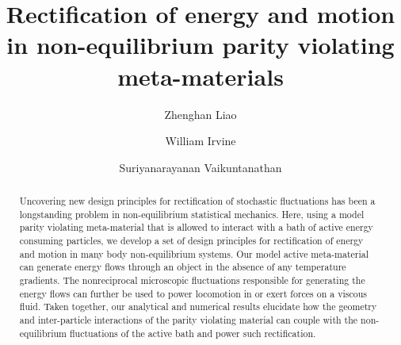 \documentclass[
 preprint,
 preprintnumbers,
 amsmath,amssymb,
 aps,
 pre,
 longbibliography,
 superscriptaddress,
 10pt, twocolumn
]{revtex4-1}
\begin{document}
\newcommand{\eqnname}{Eq.}
\newcommand{\secname}{Sec.}


\title{Rectification of energy and motion in non-equilibrium parity violating meta-materials}


\author{Zhenghan Liao}
\author{William Irvine}
\author{Suriyanarayanan Vaikuntanathan}


\begin{abstract}
Uncovering new design principles for rectification of stochastic fluctuations has been a longstanding problem in non-equilibrium statistical mechanics. Here, using a model parity violating meta-material that is allowed to interact with a bath of active energy consuming particles, we develop a set of design principles for rectification of energy and motion in many body non-equilibrium systems. Our model active meta-material can generate energy flows through an object in the absence of any temperature gradients. The nonreciprocal microscopic fluctuations responsible for generating the energy flows can further be used to power locomotion in or exert forces on a viscous fluid. Taken together, our analytical and numerical results elucidate how the geometry and inter-particle interactions of the parity violating material can couple with the non-equilibrium fluctuations of the active bath and power such rectification.  
\end{abstract}

\maketitle
\end{document}
